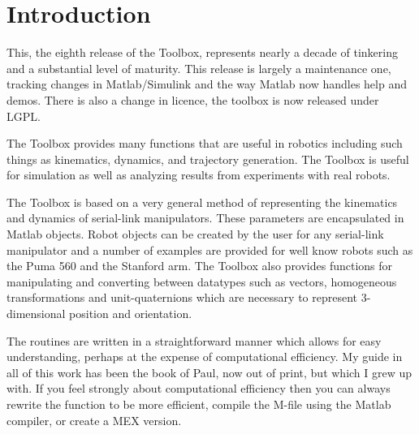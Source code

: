 \documentclass{article}
\begin{document}
\section{Introduction}
This, the eighth release of the Toolbox, represents nearly a decade of %
tinkering and a substantial level of maturity.  This release is largely a maintenance one, tracking
changes in Matlab/Simulink and the way Matlab now handles help and demos.  There is also
a change in licence, the toolbox is now released under LGPL.

The Toolbox provides many functions that are useful in robotics
including such things as kinematics, dynamics, and  trajectory generation.
The Toolbox is useful for simulation as well as analyzing results from
experiments with real robots.

The Toolbox is based on a very general method of representing the kinematics
and dynamics of serial-link manipulators.
These parameters  are encapsulated in Matlab objects.  Robot objects
can be created by the user for any serial-link manipulator and a number
of examples are provided for well know robots such as the Puma 560 and the
Stanford arm.
The Toolbox also provides functions for manipulating and converting
between datatypes such
as vectors, homogeneous transformations and unit-quaternions which are necessary
to represent 3-dimensional position and orientation.

The routines are written in a straightforward manner which allows
for easy understanding, perhaps at the expense of computational efficiency.
My guide in all of this work has been the book of Paul\cite{Paul81a}, now
out of print, but which I grew up with.
If you feel strongly about computational efficiency then you can always
rewrite the function to be more efficient,
compile the M-file using the Matlab compiler, or
create a MEX version.
\end{document}
